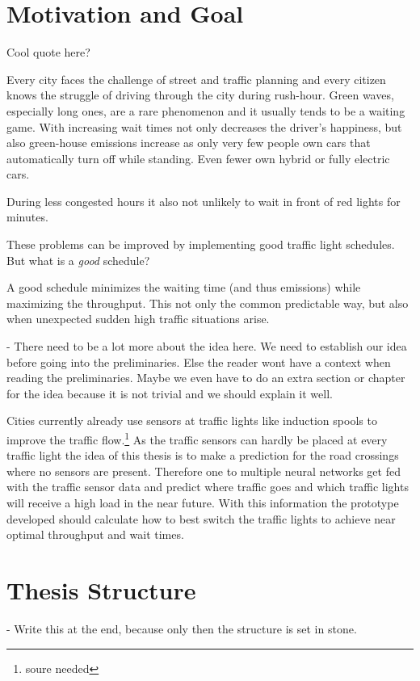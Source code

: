 \section{Motivation and Goal}

Cool quote here?

Every city faces the challenge of street and traffic planning and every citizen knows the struggle of driving through the city during rush-hour. Green waves, especially long ones, are a rare phenomenon and it usually tends to be a waiting game.
With increasing wait times not only decreases the driver's happiness, but also green-house emissions increase as only very few people own cars that automatically turn off while standing. Even fewer own hybrid or fully electric cars.

During less congested hours it also not unlikely to wait in front of red lights for minutes.

These problems can be improved by implementing good traffic light schedules. But what is a \emph{good} schedule?

A good schedule minimizes the waiting time (and thus emissions) while maximizing the throughput. This not only the common predictable way, but also when unexpected sudden high traffic situations arise.

- There need to be a lot more about the idea here. We need to establish our idea before going into the preliminaries. Else the reader wont have a context when reading the preliminaries. Maybe we even have to do an extra section or chapter for the idea because it is not trivial and we should explain it well.

Cities currently already use sensors at traffic lights like induction spools to improve the traffic flow.\footnote{soure needed} As the traffic sensors can hardly be placed at every traffic light the idea of this thesis is to make a prediction for the road crossings where no sensors are present. Therefore one to multiple neural networks get fed with the traffic sensor data and predict where traffic goes and which traffic lights will receive a high load in the near future. With this information the prototype developed should calculate how to best switch the traffic lights to achieve near optimal throughput and wait times.

\section{Thesis Structure}

- Write this at the end, because only then the structure is set in stone.